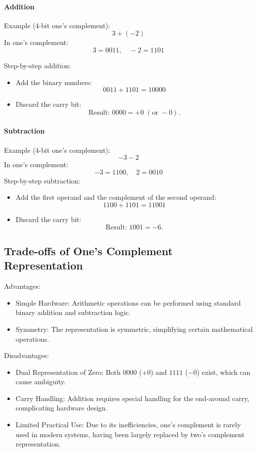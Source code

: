 \paragraph{Addition} Example (4-bit one's complement):
\[
3 + (-2)
\]
In one's complement:
\[
3 = 0011, \quad -2 = 1101
\]

Step-by-step addition:
\begin{itemize}
    \item Add the binary numbers:
   \[
   0011 + 1101 = 10000
   \]
    \item Discard the carry bit:
   \[
   \text{Result: } 0000 = +0 \; (\text{or } -0).
   \]
\end{itemize}

\paragraph{Subtraction} Example (4-bit one's complement):
\[
-3 - 2
\]
In one's complement:
\[
-3 = 1100, \quad 2 = 0010
\]
Step-by-step subtraction:
\begin{itemize}
    \item Add the first operand and the complement of the second operand:
   \[
   1100 + 1101 = 1 1001
   \]
    \item Discard the carry bit:
   \[
   \text{Result: } 1001 = -6.
   \]
\end{itemize}

\subsection{Trade-offs of One's Complement Representation}
Advantages:
\begin{itemize}
    \item Simple Hardware: Arithmetic operations can be performed using standard binary addition and subtraction logic.
    \item Symmetry: The representation is symmetric, simplifying certain mathematical operations.
\end{itemize}

\noindent Disadvantages:
\begin{itemize}
    \item Dual Representation of Zero: Both \( 0000 \) (\( +0 \)) and \( 1111 \) (\( -0 \)) exist, which can cause ambiguity.
    \item Carry Handling: Addition requires special handling for the end-around carry, complicating hardware design.
    \item Limited Practical Use: Due to its inefficiencies, one's complement is rarely used in modern systems, having been largely replaced by two's complement representation.
\end{itemize}

